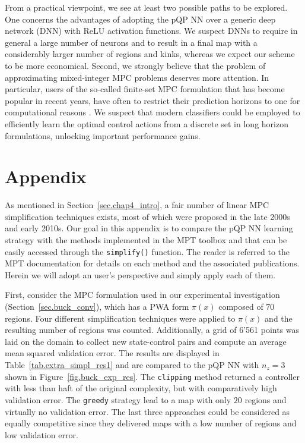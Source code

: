 From a practical viewpoint, we see at least two possible paths to be explored. One concerns the advantages of adopting the pQP NN over a generic deep network (DNN) with ReLU activation functions. We suspect DNNs to require in general a large number of neurons and to result in a final map with a considerably larger number of regions and kinks, whereas we expect our scheme to be more economical. Second, we strongly believe that the problem of approximating mixed-integer MPC problems deserves more attention. In particular, users of the so-called finite-set MPC formulation \citep{karamanakos2019guidelines} that has become popular in recent years, have often to restrict their prediction horizons to one for computational reasons \citep{kim2015offset}. We suspect that modern classifiers could be employed to efficiently learn the optimal control actions from a discrete set in long horizon formulations, unlocking important performance gains.


\pagebreak

\section{Appendix}

As mentioned in Section~\ref{sec.chap4_intro}, a fair number of linear MPC simplification techniques exists, most of which were proposed in the late 2000s and early 2010s. Our goal in this appendix is to compare the pQP NN learning strategy with the methods implemented in the MPT toolbox \citep{herceg2013multi} and that can be easily accessed through the \texttt{simplify()} function. The reader is referred to the MPT documentation for details on each method and the associated publications. Herein we will adopt an user's perspective and simply apply each of them.

First, consider the MPC formulation used in our experimental investigation (Section~\ref{sec.buck_conv}), which has a PWA form $\pi(x)$ composed of $70$ regions. Four different simplification techniques were applied to $\pi(x)$ and the resulting number of regions was counted. Additionally, a grid of 6'561 points was laid on the domain to collect new state-control pairs and compute an average mean squared validation error. The results are displayed in Table~\ref{tab.extra_simpl_res1} and are compared to the pQP NN with $n_z=3$ shown in Figure~\ref{fig.buck_exp_res}. The \texttt{clipping} method returned a controller with less than haft of the original complexity, but with comparatively high validation error. The \texttt{greedy} strategy lead to a map with only $20$ regions and virtually no validation error. The last three approaches could be considered as equally competitive since they delivered maps with a low number of regions and low validation error.

